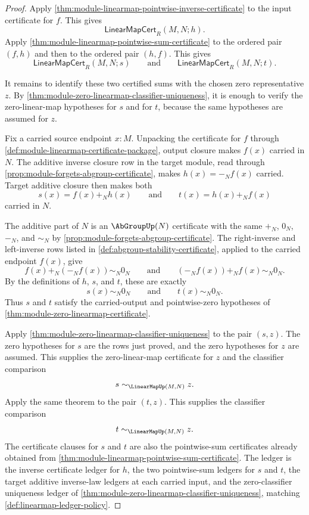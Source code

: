 \begin{proof}
Apply \autoref{thm:module-linearmap-pointwise-inverse-certificate} to the input certificate for $f$. This gives
$$
\mathsf{LinearMapCert}_R(M,N;h).
$$
Apply \autoref{thm:module-linearmap-pointwise-sum-certificate} to the ordered pair $(f,h)$ and then to the ordered pair $(h,f)$. This gives
$$
\mathsf{LinearMapCert}_R(M,N;s)
\qquad\text{and}\qquad
\mathsf{LinearMapCert}_R(M,N;t).
$$

It remains to identify these two certified sums with the chosen zero representative $z$. By \autoref{thm:module-zero-linearmap-classifier-uniqueness}, it is enough to verify the zero-linear-map hypotheses for $s$ and for $t$, because the same hypotheses are assumed for $z$.

Fix a carried source endpoint $x:M$. Unpacking the certificate for $f$ through \autoref{def:module-linearmap-certificate-package}, output closure makes $f(x)$ carried in $N$. The additive inverse closure row in the target module, read through \autoref{prop:module-forgets-abgroup-certificate}, makes $h(x)=-_N f(x)$ carried. Target additive closure then makes both
$$
s(x)=f(x)+_N h(x)
\qquad\text{and}\qquad
t(x)=h(x)+_N f(x)
$$
carried in $N$.

The additive part of $N$ is an $\AbGroupUp(N)$ certificate with the same $+_N$, $0_N$, $-_N$, and $\sim_N$ by \autoref{prop:module-forgets-abgroup-certificate}. The right-inverse and left-inverse rows listed in \autoref{def:abgroup-stability-certificate}, applied to the carried endpoint $f(x)$, give
$$
f(x)+_N(-_N f(x))\sim_N0_N
\qquad\text{and}\qquad
(-_N f(x))+_Nf(x)\sim_N0_N.
$$
By the definitions of $h$, $s$, and $t$, these are exactly
$$
s(x)\sim_N0_N
\qquad\text{and}\qquad
t(x)\sim_N0_N.
$$
Thus $s$ and $t$ satisfy the carried-output and pointwise-zero hypotheses of \autoref{thm:module-zero-linearmap-certificate}.

Apply \autoref{thm:module-zero-linearmap-classifier-uniqueness} to the pair $(s,z)$. The zero hypotheses for $s$ are the rows just proved, and the zero hypotheses for $z$ are assumed. This supplies the zero-linear-map certificate for $z$ and the classifier comparison
$$
s\sim_{\LinearMapUp(M,N)}z.
$$
Apply the same theorem to the pair $(t,z)$. This supplies the classifier comparison
$$
t\sim_{\LinearMapUp(M,N)}z.
$$
The certificate clauses for $s$ and $t$ are also the pointwise-sum certificates already obtained from \autoref{thm:module-linearmap-pointwise-sum-certificate}. The ledger is the inverse certificate ledger for $h$, the two pointwise-sum ledgers for $s$ and $t$, the target additive inverse-law ledgers at each carried input, and the zero-classifier uniqueness ledger of \autoref{thm:module-zero-linearmap-classifier-uniqueness}, matching \autoref{def:linearmap-ledger-policy}.
\end{proof}

